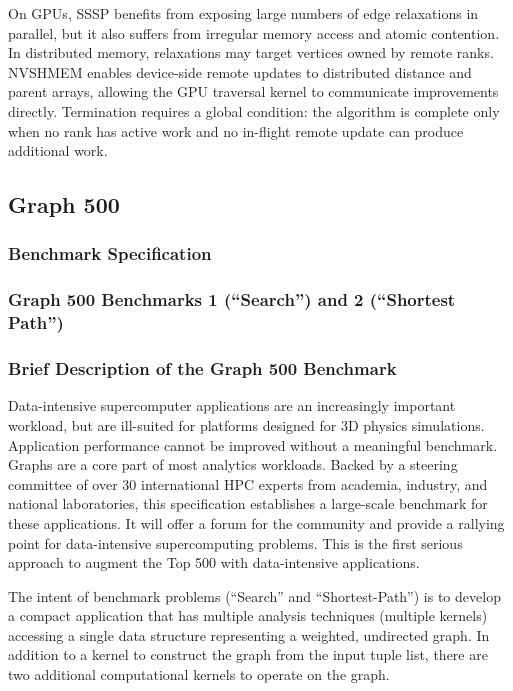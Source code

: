 \documentclass{article}
\begin{document}
On GPUs, SSSP benefits from exposing large numbers of edge relaxations in parallel, but it also suffers from irregular memory access and atomic contention. In distributed memory, relaxations may target vertices owned by remote ranks. NVSHMEM enables device-side remote updates to distributed distance and parent arrays, allowing the GPU traversal kernel to communicate improvements directly. Termination requires a global condition: the algorithm is complete only when no rank has active work and no in-flight remote update can produce additional work.

\subsection{Graph 500}

\subsubsection*{Benchmark Specification}
\subsubsection*{Graph 500 Benchmarks 1 (``Search'') and 2 (``Shortest Path'')}
\subsubsection*{Brief Description of the Graph 500 Benchmark}

Data-intensive supercomputer applications are an increasingly important workload, but are ill-suited for platforms designed for 3D physics simulations. Application performance cannot be improved without a meaningful benchmark. Graphs are a core part of most analytics workloads. Backed by a steering committee of over 30 international HPC experts from academia, industry, and national laboratories, this specification establishes a large-scale benchmark for these applications. It will offer a forum for the community and provide a rallying point for data-intensive supercomputing problems. This is the first serious approach to augment the Top 500 with data-intensive applications.

The intent of benchmark problems (``Search'' and ``Shortest-Path'') is to develop a compact application that has multiple analysis techniques (multiple kernels) accessing a single data structure representing a weighted, undirected graph. In addition to a kernel to construct the graph from the input tuple list, there are two additional computational kernels to operate on the graph.
\end{document}

